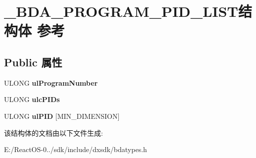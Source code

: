 \hypertarget{struct___b_d_a___p_r_o_g_r_a_m___p_i_d___l_i_s_t}{}\section{\+\_\+\+B\+D\+A\+\_\+\+P\+R\+O\+G\+R\+A\+M\+\_\+\+P\+I\+D\+\_\+\+L\+I\+S\+T结构体 参考}
\label{struct___b_d_a___p_r_o_g_r_a_m___p_i_d___l_i_s_t}
\subsection*{Public 属性}
\begin{DoxyCompactItemize}
\item 
\mbox{\label{struct___b_d_a___p_r_o_g_r_a_m___p_i_d___l_i_s_t_a41d1437ca0e1dbb7d08e08fa877838a1}} 
U\+L\+O\+NG {\bfseries ul\+Program\+Number}
\item 
\mbox{\label{struct___b_d_a___p_r_o_g_r_a_m___p_i_d___l_i_s_t_a5610dc95bdf80b669f00301e71bbb5cf}} 
U\+L\+O\+NG {\bfseries ulc\+P\+I\+Ds}
\item 
\mbox{\label{struct___b_d_a___p_r_o_g_r_a_m___p_i_d___l_i_s_t_a074025da21f5e7476f0ab42b2ad26995}} 
U\+L\+O\+NG {\bfseries ul\+P\+ID} \mbox{[}M\+I\+N\+\_\+\+D\+I\+M\+E\+N\+S\+I\+ON\mbox{]}
\end{DoxyCompactItemize}


该结构体的文档由以下文件生成\+:\begin{DoxyCompactItemize}
\item 
E\+:/\+React\+O\+S-\/0../sdk/include/dxsdk/bdatypes.\+h\end{DoxyCompactItemize}
